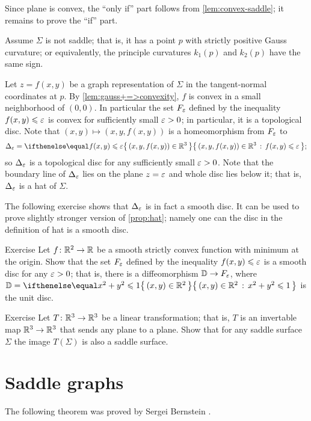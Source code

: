 Since plane is convex, the ``only if'' part follows from \ref{lem:convex-saddle};
it remains to prove the ``if'' part.

Assume $\Sigma$ is not saddle; that is, it has a point $p$ with strictly positive Gauss curvature;
or equivalently, the principle curvatures $k_1(p)$ and $k_2(p)$ have the same sign.


Let $z=f(x,y)$ be a graph representation of $\Sigma$ in the tangent-normal coordinates at $p$.
By \ref{lem:gauss+=>convexity}, $f$ is convex in a small neighborhood of $(0,0)$.
In particular the set $F_\varepsilon$ defined by the inequality $f(x,y)\leqslant \varepsilon$ is convex for sufficiently small $\varepsilon>0$;
in particular, it is a topological disc.
Note that $(x,y)\mapsto (x,y,f(x,y))$ is a homeomorphism from $F_\varepsilon$
to
\[\Delta_\eps=\set{(x,y,f(x,y))\in \RR^3}{f(x,y)\le \eps};\]
so $\Delta_\varepsilon$ is a topological disc for any sufficiently small $\varepsilon>0$.
Note that the boundary line of $\Delta_\varepsilon$ lies on the plane $z=\varepsilon$ and whole disc lies below it;
that is, $\Delta_\varepsilon$ is a hat of $\Sigma$.
\qeds

The following exercise shows that $\Delta_\varepsilon$ is in fact a smooth disc.
It can be used to prove slightly stronger version of \ref{prop:hat};
namely one can the disc in the definition of hat is a smooth disc.

\begin{thm}{Exercise}\label{ex:disc-hat}
Let $f\colon\mathbb{R}^2\to\mathbb{R}$ be a smooth strictly convex function with minimum at the origin.
Show that the set $F_\varepsilon$ defined by the inequality $f(x,y)\leqslant \varepsilon$ is a smooth disc for any $\varepsilon>0$;
that is, there is a diffeomorphism %
$\mathbb{D}\to F_\varepsilon$, where $\DD=\set{(x,y)\in\RR^2}{x^2+y^2\le 1}$ is the unit disc.
\end{thm}

\begin{thm}{Exercise}\label{ex:saddle-linear}
Let $T\colon\mathbb{R}^3\to\mathbb{R}^3$ be a linear transformation; that is, $T$ is an invertable map $\mathbb{R}^3\to\mathbb{R}^3$ that sends any plane to a plane. 
Show that for any saddle surface $\Sigma$ the image $T(\Sigma)$ is also a saddle surface.
\end{thm}

\section*{Saddle graphs}

The following theorem was proved by Sergei Bernstein \cite{bernstein}.

